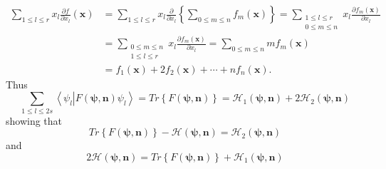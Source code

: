 \documentclass[aps,preprint]{revtex4}%
\begin{document}
\begin{align}%
{\textstyle\sum\limits_{1\leq l\leq r}}
x_{l}\frac{\partial f}{\partial x_{l}}\left(  \mathbf{x}\right)   &  =%
{\textstyle\sum\limits_{1\leq l\leq r}}
x_{l}\frac{\partial}{\partial x_{l}}\left\{
{\textstyle\sum\limits_{0\leq m\leq n}}
f_{m}\left(  \mathbf{x}\right)  \right\}  =%
{\textstyle\sum\limits_{\substack{1\leq l\leq r\\0\leq m\leq n}}}
x_{l}\frac{\partial f_{m}\left(  \mathbf{x}\right)  }{\partial x_{l}%
}\nonumber\\
&  =%
{\textstyle\sum\limits_{\substack{0\leq m\leq n\\1\leq l\leq r}}}
x_{l}\frac{\partial f_{m}\left(  \mathbf{x}\right)  }{\partial x_{l}}=%
{\textstyle\sum\limits_{0\leq m\leq n}}
mf_{m}\left(  \mathbf{x}\right) \nonumber\\
&  =f_{1}\left(  \mathbf{x}\right)  +2f_{2}\left(  \mathbf{x}\right)
+\cdots+nf_{n}\left(  \mathbf{x}\right)  .
\end{align}
Thus
\begin{equation}%
{\textstyle\sum\limits_{1\leq l\leq2s}}
\left\langle \left.  \psi_{l}\right\vert F\left(  \mathbf{\psi,n}\right)
\psi_{l}\right\rangle =Tr\left\{  F\left(  \mathbf{\psi,n}\right)  \right\}
=\mathcal{H}_{1}\left(  \mathbf{\psi,n}\right)  +2\mathcal{H}_{2}\left(
\mathbf{\psi,n}\right)
\end{equation}
showing that
\begin{equation}
Tr\left\{  F\left(  \mathbf{\psi,n}\right)  \right\}  -\mathcal{H}\left(
\mathbf{\psi,n}\right)  =\mathcal{H}_{2}\left(  \mathbf{\psi,n}\right)
\end{equation}
and
\begin{equation}
2\mathcal{H}\left(  \mathbf{\psi,n}\right)  =Tr\left\{  F\left(
\mathbf{\psi,n}\right)  \right\}  +\mathcal{H}_{1}\left(  \mathbf{\psi
,n}\right)
\end{equation}
\end{document}
